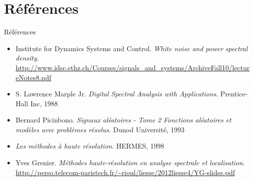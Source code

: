 \documentclass[10pt]{beamer}
\begin{document}

\section {Références}
\begin{frame}{Références}

\begin{itemize}
  \item
  Institute for Dynamics Systems and Control. \textit{White noise and power spectral density}.\\
  \url{http://www.idsc.ethz.ch/Courses/signals_and_systems/ArchiveFall10/lectureNotes8.pdf}
  
  \item S. Lawrence Marple Jr. \textit{Digital Spectral Analysis with Applications}. Prentice-Hall Inc, 1988
  
  \item Bernard Picinbono. \textit{Signaux aléatoires - Tome 2 Fonctions aléatoires et modèles avec problèmes résolus}. Dunod Université, 1993
  
  \item \textit{Les méthodes à haute résolution}. HERMES, 1998
  
  \item Yves Grenier. \textit{Méthodes haute-résolution en analyse spectrale et localisation}. \\
  \url{http://perso.telecom-paristech.fr/~rioul/liesse/2012liesse4/YG-slides.pdf}
  
\end{itemize}

\end{frame}
\end{document}
